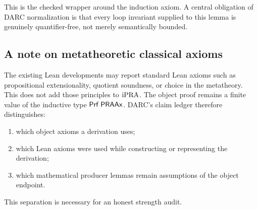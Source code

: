 This is the checked  wrapper around the induction axiom.  A
central obligation of DARC normalization is that every loop invariant supplied
to this lemma is genuinely quantifier-free, not merely semantically bounded.

\subsection{A note on metatheoretic classical axioms}

The existing Lean developments may report standard Lean axioms such as
propositional extensionality, quotient soundness, or choice in the
metatheory.  This does not add those principles to \(\mathrm{iPRA}\).  The object
proof remains a finite value of the inductive type \(\mathsf{Prf}\;\mathsf{PRAAx}\).  DARC's
claim ledger therefore distinguishes:
\begin{enumerate}
  \item which object axioms a derivation uses;
  \item which Lean axioms were used while constructing or representing the
        derivation;
  \item which mathematical producer lemmas remain assumptions of the object
        endpoint.
\end{enumerate}
This separation is necessary for an honest strength audit.
